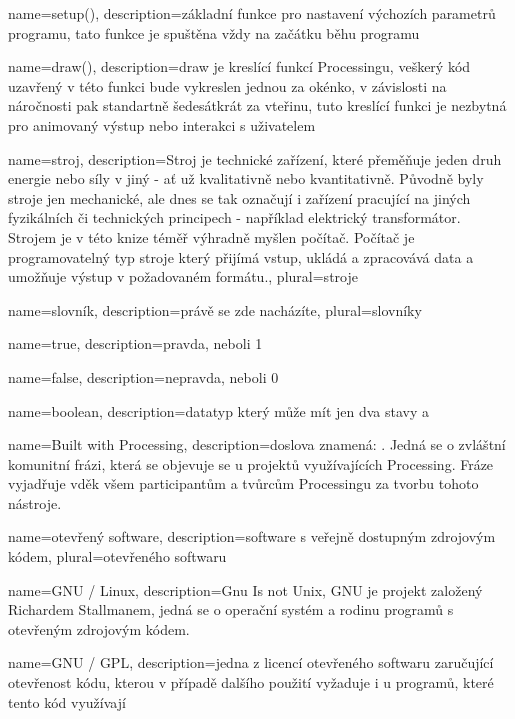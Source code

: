 {
  name={setup()},
  description={základní funkce pro nastavení výchozích parametrů programu, tato funkce je spuštěna vždy na začátku běhu programu}
}

{
  name={draw()},
  description={draw je kreslící funkcí Processingu, veškerý kód uzavřený v této funkci bude vykreslen jednou za okénko, v závislosti na náročnosti pak standartně šedesátkrát za vteřinu, tuto kreslící funkci je nezbytná pro animovaný výstup nebo interakci s uživatelem}
}

{
  name={stroj},
  description={Stroj je technické zařízení, které přeměňuje jeden druh energie nebo síly v jiný - ať už kvalitativně nebo kvantitativně. Původně byly stroje jen mechanické, ale dnes se tak označují i zařízení pracující na jiných fyzikálních či technických principech - například elektrický transformátor. Strojem je v této knize téměř výhradně myšlen počítač. Počítač je programovatelný typ stroje který přijímá vstup, ukládá a zpracovává data a umožňuje výstup v požadovaném formátu.},
  plural={stroje}
}

{
  name={slovník},
  description={právě se zde nacházíte},
  plural={slovníky}
}


{
  name={true},
  description={pravda, neboli 1}
}

{
  name={false},
  description={nepravda, neboli 0}
}

{
  name={boolean},
  description={datatyp který může mít jen dva stavy  a }
}

{
	name={Built with Processing},
	description={doslova znamená: . Jedná se o zvláštní komunitní frázi, která se objevuje se u projektů využívajících Processing. Fráze vyjadřuje vděk všem participantům a tvůrcům Processingu za tvorbu tohoto nástroje.}
}

{
  name={otevřený software},
  description={software s veřejně dostupným zdrojovým kódem},
  plural={otevřeného softwaru}
}

{
  name={GNU / Linux},
  description={Gnu Is not Unix, GNU je projekt založený Richardem Stallmanem, jedná se o operační systém a rodinu programů s otevřeným zdrojovým kódem.}
}

{
  name={GNU / GPL},
  description={jedna z licencí otevřeného softwaru zaručující otevřenost kódu, kterou v případě dalšího použití vyžaduje i u programů, které tento kód využívají}
}

